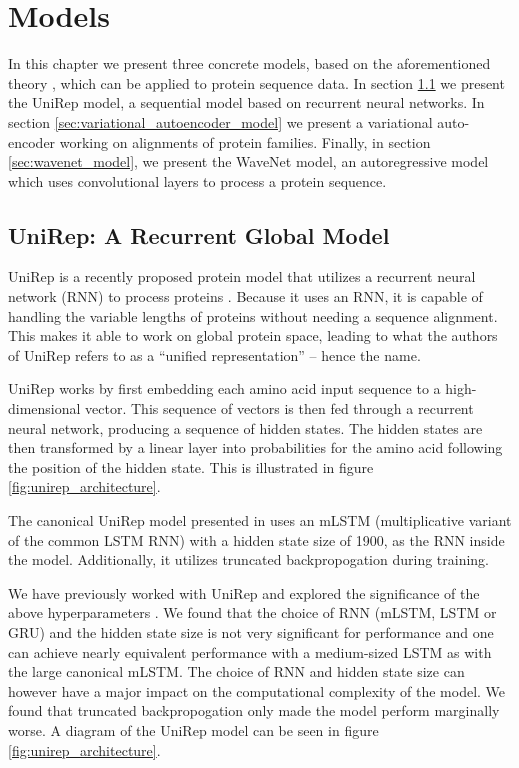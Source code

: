 \chapter{Models}
\label{chapter:models}

In this chapter we present three concrete models, based on the aforementioned theory , which can be applied to protein sequence data. In section \ref{sec:unirep_model} we present the UniRep model, a sequential model based on recurrent neural networks. In section \ref{sec:variational_autoencoder_model} we present a variational auto-encoder working on alignments of protein families. Finally, in section \ref{sec:wavenet_model}, we present the WaveNet model, an autoregressive model which uses convolutional layers to process a protein sequence.%

\section{UniRep: A Recurrent Global Model}
\label{sec:unirep_model}
UniRep is a recently proposed protein model that utilizes a recurrent neural network (RNN) to process proteins \cite{alley2019unified}. Because it uses an RNN, it is capable of handling the variable lengths of proteins without needing a sequence alignment. This makes it able to work on global protein space, leading to what the authors of UniRep refers to as a ``unified representation'' -- hence the name.

UniRep works by first embedding each amino acid input sequence to a high-dimensional vector. This sequence of vectors is then fed through a recurrent neural network, producing a sequence of hidden states. The hidden states are then transformed by a linear layer into probabilities for the amino acid following the position of the hidden state. This is illustrated in figure \ref{fig:unirep_architecture}.

The canonical UniRep model presented in \cite{alley2019unified} uses an mLSTM (multiplicative  variant of the common LSTM RNN) with a hidden state size of 1900, as the RNN inside the model. Additionally, it utilizes truncated backpropogation during training.

We have previously worked with UniRep and explored the significance of the above hyperparameters \cite{unirepproject}. We found that the choice of RNN (mLSTM, LSTM or GRU) and the hidden state size is not very significant for performance and one can achieve nearly equivalent performance with a medium-sized LSTM as with the large canonical mLSTM. The choice of RNN and hidden state size can however have a major impact on the computational complexity of the model. We found that truncated backpropogation only made the model perform marginally worse. A diagram of the UniRep model can be seen in figure \ref{fig:unirep_architecture}.

